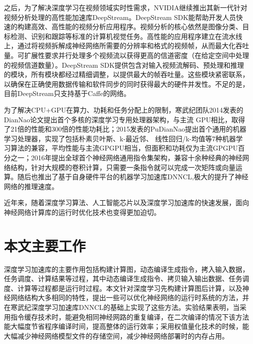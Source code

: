 之后，为了解决深度学习在视频领域实时性需求，NVIDIA继续推出其新一代针对视频分析处理的高性能加速库DeepStream\cite{deepstream}。DeepStream SDK能帮助开发人员快速的构建高效、高性能的视频分析应用程序。视频分析的核心依然是图像分类、目标检测、识别和跟踪等标准的计算机视觉任务。高性能的应用程序建立在流水线上，通过将视频拆解成神经网络所需要的分辨率和格式的视频帧，从而最大化吞吐量。可扩展性要求并行处理多个视频流以获得更高的信道密度（在给定空间中处理的视频信道数量）\cite{zhangwei}。DeepStream SDK提供包含对输入视频流解码、预处理和推理的模块，所有模块都经过精细调整，以提供最大的帧吞吐量\cite{lzl}。这些模块紧密联系，以确保在正确使用数据传输和软件同步的同时获得最大的硬件并发性。不足的是，目前DeepStream只支持基于Caffe的网络\cite{lgf}。

为了解决CPU+GPU在算力、功耗和任务分配上的限制，寒武纪团队2014发表的DianNao论文提出首个多核的深度学习专用处理器架构，与主流 GPU相比，取得了21倍的性能和300倍的性能功耗比\cite{chent}；2015发表的PuDianNao提出首个通用的机器学习处理器，实现了包括朴素贝叶斯、k-最近邻、 线性回归/k-均值等7种机器学习算法的兼容，平均性能与主流GPGPU相当，但面积和功耗仅为主流GPGPU百分之一\cite{liuD}；2016年提出全球首个神经网络通用指令集架构，兼容十余种经典的神经网络结构，针对大规模的卷积计算，只需要一条指令就可以完成一次矩阵或向量运算\cite{lius}。随后也推出了基于自身硬件平台的机器学习加速库DNNCL,极大的提升了神经网络的推理速度\cite{cheny}。

近年来，随着深度学习算法、人工智能芯片以及深度学习加速库的快速发展，面向神经网络计算库的运行时优化技术也变得更加迫切。

\section{本文主要工作}

深度学习加速库的主要作用包括构建计算图，动态编译生成指令，拷入输入数据，任务调度、计算结果等过程，其中动态编译生成指令、拷贝输入输出数据、任务调度、计算等过程都是运行时过程。本文针对深度学习先构建计算图后计算，以及神经网络结构大多相同的特性，提出一些可以优化神经网络的运行时系统的方法，并在寒武纪深度学习加速库DNNCL的基础上实现了这些方法。实验结果表明，当采用指令缓存技术时，能避免相同神经网路的重复编译，在二次编译的情况下该方法能大幅度节省程序编译时间，提高整体的运行效率；采用权值量化技术的时候，能大幅减少神经网络模型文件的存储空间，减少神经网络部署时的内存占用。

